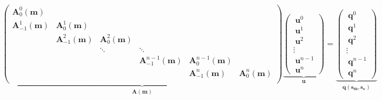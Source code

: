 \begin{equation}
    \underbrace{
        \begin{pmatrix}
            \mathbf{A}^{0}_{0}(\mathbf{m})  &                                 &                                &                                   &                                   &                                  \\
            \mathbf{A}^{1}_{-1}(\mathbf{m}) & \mathbf{A}^{1}_{0}(\mathbf{m})  &                                &                                   &                                   &                                  \\
                                            & \mathbf{A}^{2}_{-1}(\mathbf{m}) & \mathbf{A}^{2}_{0}(\mathbf{m}) &                                   &                                   &                                  \\
                                            &                                 & \ddots                         & \ddots                            &                                   &                                  \\
                                            &                                 &                                & \mathbf{A}^{n-1}_{-1}(\mathbf{m}) & \mathbf{A}^{n-1}_{0}(\mathbf{m})  &                                  \\
                                            &                                 &                                &                                   & \mathbf{A}^{n}_{-1}(\mathbf{m})   & \mathbf{A}^{n}_{0}(\mathbf{m})   \\
        \end{pmatrix}
    }_{\mathbf{A(m)}}
    \underbrace{
        \begin{pmatrix}
            ~\mathbf{u}^{0~~~}     \\
            ~\mathbf{u}^{1~~~}     \\
            ~\mathbf{u}^{2~~~}     \\
            \vdots~                 \\
            ~\mathbf{u}^{n-1}       \\
            ~\mathbf{u}^{n~~~}
        \end{pmatrix}
    }_{\mathbf{u}}
    =
    \underbrace{
        \begin{pmatrix}
            ~\mathbf{q}^{0~~~}     \\
            ~\mathbf{q}^{1~~~}     \\
            ~\mathbf{q}^{2~~~}     \\
            \vdots~                 \\
            ~\mathbf{q}^{n-1}       \\
            ~\mathbf{q}^{n~~~}
        \end{pmatrix}
    }_{\mathbf{q(s_m, s_e)}}
    \label{eq:TDEM_full}
\end{equation}
